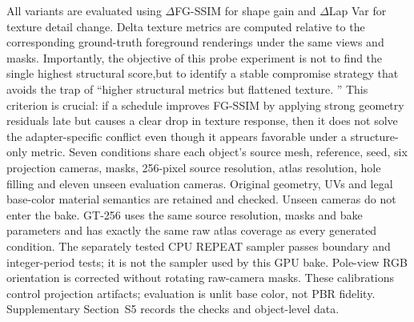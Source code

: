 \documentclass[times,twocolumn,final]{elsarticle}
\providecommand{\DIFadd}[1]{{\protect\color{blue} \sf #1}} %
\providecommand{\DIFdel}[1]{{\protect\color{red} \scriptsize #1}} %
\providecommand{\DIFaddbegin}{} %
\providecommand{\DIFaddend}{} %
\providecommand{\DIFdelbegin}{} %
\providecommand{\DIFdelend}{} %
\begin{document}
\DIFdelbegin \DIFdel{All variants are evaluated using $\Delta$FG-SSIM for shape gain and $\Delta$Lap Var for texture detail change. Delta texture metrics are computed relative to the corresponding ground-truth foreground renderings under the same views and masks. Importantly, the objective of this probe experiment is not to find the single highest structural score,but to identify a stable compromise strategy that avoids the trap of ``higher structural metrics but flattened texture. '' This criterion is crucial: if a schedule improves FG-SSIM by applying strong geometry residuals late but causes a clear drop in texture response, then it does not solve the adapter-specific conflict even though it appears favorable under a structure-only metric. }\DIFdelend \DIFaddbegin \DIFadd{Seven conditions share each object's source mesh, reference, seed, six projection cameras, masks, 256-pixel source resolution, atlas resolution, hole filling and eleven unseen evaluation cameras. Original geometry, UVs and legal base-color material semantics are retained and checked. Unseen cameras do not enter the bake. GT-256 uses the same source resolution, masks and bake parameters and has exactly the same raw atlas coverage as every generated condition. The separately tested CPU REPEAT sampler passes boundary and integer-period tests; it is not the sampler used by this GPU bake. Pole-view RGB orientation is corrected without rotating raw-camera masks. These calibrations control projection artifacts; evaluation is unlit base color, not PBR fidelity. Supplementary Section~S5 records the checks and object-level data.
}\DIFaddend 
\end{document}
